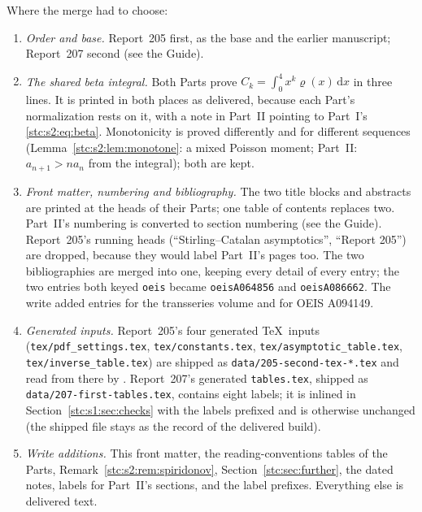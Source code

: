 \documentclass[11pt,letterpaper]{article}
\numberwithin{equation}{section}
\theoremstyle{remark}\newtheorem{remark}[theorem]{Remark}
\newcommand{\dd}{\,\mathrm d}
\newcommand{\file}[1]{\nolinkurl{#1}}
\begin{document}
Where the merge had to choose:
\begin{enumerate}
\item \emph{Order and base.} Report~205 first, as the base and the earlier manuscript; Report~207 second (see the Guide).
\item \emph{The shared beta integral.} Both Parts prove $C_k=\int_0^4x^k\varrho(x)\dd x$ in three lines. It is printed in both places as delivered, because each Part's normalization rests on it, with a note in Part~II pointing to Part~I's \eqref{stc:s2:eq:beta}. Monotonicity is proved differently and for different sequences (Lemma~\ref{stc:s2:lem:monotone}: a mixed Poisson moment; Part~II: $a_{n+1}>na_n$ from the integral); both are kept.
\item \emph{Front matter, numbering and bibliography.} The two title blocks and abstracts are printed at the heads of their Parts; one table of contents replaces two. Part~II's numbering is converted to section numbering (see the Guide). Report~205's running heads (``Stirling--Catalan asymptotics'', ``Report 205'') are dropped, because they would label Part~II's pages too. The two bibliographies are merged into one, keeping every detail of every entry; the two entries both keyed \texttt{oeis} became \texttt{oeisA064856} and \texttt{oeisA086662}. The write added entries for the transseries volume and for OEIS A094149.
\item \emph{Generated inputs.} Report~205's four generated \TeX\ inputs (\file{tex/pdf_settings.tex}, \file{tex/constants.tex}, \file{tex/asymptotic_table.tex}, \file{tex/inverse_table.tex}) are shipped as \file{data/205-second-tex-*.tex} and read from there by \verb!!. Report~207's generated \file{tables.tex}, shipped as \file{data/207-first-tables.tex}, contains eight labels; it is inlined in Section~\ref{stc:s1:sec:checks} with the labels prefixed and is otherwise unchanged (the shipped file stays as the record of the delivered build).
\item \emph{Write additions.} This front matter, the reading-conventions tables of the Parts, Remark~\ref{stc:s2:rem:spiridonov}, Section~\ref{stc:sec:further}, the dated notes, labels for Part~II's sections, and the label prefixes. Everything else is delivered text.
\end{enumerate}
\end{document}
